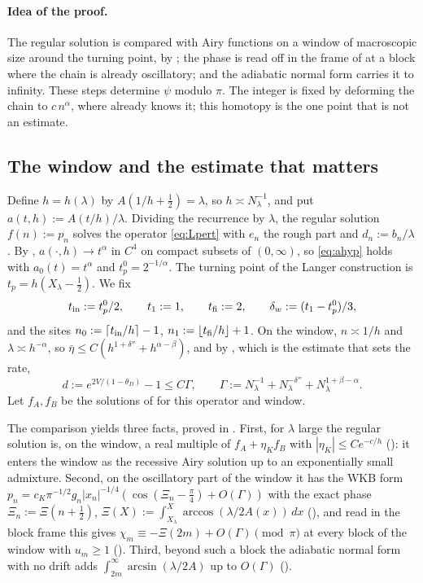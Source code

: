 \paragraph{Idea of the proof.} The regular solution is compared with Airy functions on a window of
macroscopic size around the turning point, by ; the phase is read off in the frame of
 at a block where the chain is already oscillatory; and the adiabatic normal form
carries it to infinity. These steps determine $\psi$ modulo $\pi$. The integer is fixed by deforming
the chain to $c\,n^\alpha$, where  already knows it; this homotopy is the one point
that is not an estimate.

\subsection{The window and the estimate that matters}

Define $h=h(\lambda)$ by $A(1/h+\frac12)=\lambda$, so $h\asymp N_\lambda^{-1}$, and put
$a(t,h):=A(t/h)/\lambda$. Dividing the recurrence by $\lambda$, the regular solution
$f(n):=p_n$ solves the operator \eqref{eq:Lpert} with $e_n$ the rough part and $d_n:=b_n/\lambda$.
By , $a(\cdot,h)\to t^\alpha$ in $C^4$ on compact subsets of $(0,\infty)$, so
\eqref{eq:ahyp} holds with $a_0(t)=t^\alpha$ and $t_p^0=2^{-1/\alpha}$. The turning point of the
Langer construction is $t_p=h(X_\lambda-\frac12)$. We fix
\[
  t_{\rm in}:=t_p^0/2,\qquad t_1:=1,\qquad t_{\rm fi}:=2,\qquad\delta_w:=(t_1-t_p^0)/3,
\]
and the sites $n_0:=\lceil t_{\rm in}/h\rceil-1$, $n_1:=\lfloor t_{\rm fi}/h\rfloor+1$. On the window,
$n\asymp1/h$ and $\lambda\asymp h^{-\alpha}$, so $\bar\eta\le C(h^{1+\delta''}+h^{\alpha-\beta})$, and by
, which is the estimate that sets the rate,
\begin{equation}\label{eq:Gamma}
  d:=e^{2V/(1-\theta_D)}-1\le C\Gamma,\qquad
  \Gamma:=N_\lambda^{-1}+N_\lambda^{-\delta''}+N_\lambda^{1+\beta-\alpha}.
\end{equation}
Let $f_A,f_B$ be the solutions of  for this operator and window.

The comparison yields three facts, proved in . First, for $\lambda$ large
the regular solution is, on the window, a real multiple of $f_A+\eta_Kf_B$ with $|\eta_K|\le Ce^{-c/h}$
(): it enters the window as the recessive Airy solution up to an exponentially small
admixture. Second, on the oscillatory part of the window it has the WKB form
$p_n=c_K\pi^{-1/2}g_n|x_n|^{-1/4}(\cos(\Xi_n-\frac\pi4)+O(\Gamma))$ with the exact phase
$\Xi_n:=\Xi(n+\frac12)$, $\Xi(X):=\int_{X_\lambda}^{X}\arccos(\lambda/2A(x))\,dx$ (), and read in the block
frame this gives $\chi_m\equiv-\Xi(2m)+O(\Gamma)\pmod\pi$ at every block of the window with $u_m\ge1$
(). Third, beyond such a block the adiabatic normal form with no drift adds
$\int_{2m}^\infty\arcsin(\lambda/2A)$ up to $O(\Gamma)$ ().

